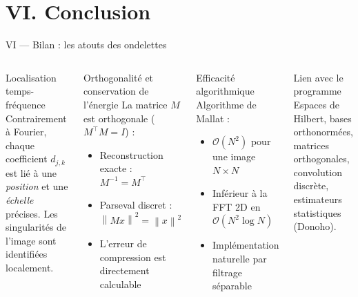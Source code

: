 \documentclass[10pt]{beamer}
\newcommand{\norme}[1]{\left\| #1 \right\|}
\begin{document}
	\section{VI. Conclusion}
	
	\begin{frame}{VI — Bilan : les atouts des ondelettes}
		
		\begin{columns}[T]
			
			\begin{block}{Localisation temps-fréquence}
				Contrairement à Fourier, chaque coefficient $d_{j,k}$
				est lié à une \emph{position} et une \emph{échelle} précises.
				Les singularités de l'image sont identifiées localement.
			\end{block}
			
			\medskip
			
			\begin{block}{Orthogonalité et conservation de l'énergie}
				La matrice $M$ est orthogonale ($M^\top M = I$) :
				\begin{itemize}
					\item Reconstruction exacte : $M^{-1} = M^\top$
					\item Parseval discret : $\norme{Mx}^2 = \norme{x}^2$
					\item L'erreur de compression est directement calculable
				\end{itemize}
			\end{block}
			
			
			\begin{block}{Efficacité algorithmique}
				Algorithme de Mallat :
				\begin{itemize}
					\item $\mathcal{O}(N^2)$ pour une image $N \times N$
					\item Inférieur à la FFT 2D en $\mathcal{O}(N^2 \log N)$
					\item Implémentation naturelle par filtrage séparable
				\end{itemize}
			\end{block}
			
			\medskip
			
			\begin{block}{Lien avec le programme}
				Espaces de Hilbert, bases orthonormées, matrices orthogonales,
				convolution discrète, estimateurs statistiques (Donoho).
			\end{block}
			
		\end{columns}
		
	\end{frame}
	
\end{document}
